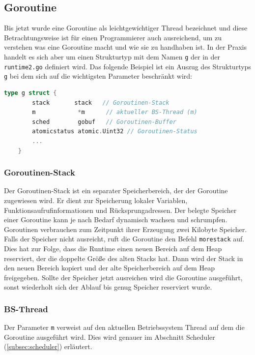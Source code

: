 \documentclass[fontsize=12pt,paper=a4,twoside=semi,parskip=half-,headsepline,headinclude]{scrreprt}
\begin{document}
\subsection{Goroutine}

Bis jetzt wurde eine Goroutine als leichtgewichtiger Thread bezeichnet und diese Betrachtungsweise ist für einen Programmierer auch ausreichend, um zu verstehen was eine Goroutine macht und wie sie zu handhaben ist. In der Praxis handelt es sich aber um einen Strukturtyp mit dem Namen \texttt{g} der in der \texttt{runtime2.go} \cite{goruntime2024} definiert wird. Das folgende Beispiel ist ein Auszug des Strukturtyps \texttt{g} bei dem sich auf die wichtigsten Parameter beschränkt wird:

\begin{lstlisting}[language=Go,extendedchars=true]
	type g struct {
		stack	    stack   // Goroutinen-Stack
		m       	 *m      // aktueller BS-Thread (m)
		sched   	 gobuf   // Goroutinen-Buffer
		atomicstatus atomic.Uint32 // Goroutinen-Status
		...
	}
\end{lstlisting}

\subsubsection{Goroutinen-Stack}

 Der Goroutinen-Stack ist ein separater Speicherbereich, der der Goroutine zugewiesen wird. Er dient zur Speicherung lokaler Variablen, Funktionsaufrufinformationen und Rücksprungadressen. Der belegte Speicher einer Goroutine kann je nach Bedarf dynamisch wachsen und schrumpfen. Goroutinen verbrauchen zum Zeitpunkt ihrer Erzeugung zwei Kilobyte Speicher. Falls der Speicher nicht ausreicht, ruft die Goroutine den Befehl \texttt{morestack} auf. Dies hat zur Folge, dass die Runtime einen neuen Bereich auf dem Heap reserviert, der die doppelte Größe des alten Stacks hat. Dann wird der Stack in den neuen Bereich kopiert und der  alte Speicherbereich auf dem Heap freigegeben. Sollte der Speicher jetzt ausreichen wird die Goroutine ausgeführt, sonst wiederholt sich der Ablauf bis genug Speicher reserviert wurde.
 
\subsubsection{BS-Thread}
 Der Parameter \texttt{m} verweist auf den aktuellen Betriebssystem Thread auf dem die Goroutine ausgeführt wird. Dies wird genauer im Abschnitt Scheduler (\ref{subsec:scheduler}) erläutert.
\end{document}
